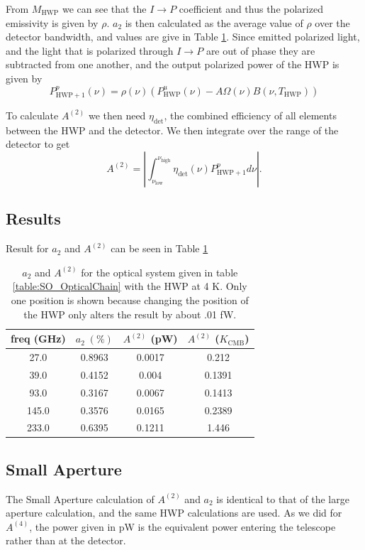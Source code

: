 \documentclass{article}
\theoremstyle{remark}
\newcommand{\tab}{\hspace*{2em}}
\renewcommand{\t}[1]{\text{#1}}
\newcommand{\A}[1]{A^{(#1)}}
\newcommand{\ip}{$I\rightarrow P$ }
\newcommand{\abs}[1]{\left|#1\right|}%
\begin{document}
\tab From $M_\t{HWP}$ we can see that the \ip coefficient and thus the polarized emissivity is given by $\rho$. 
$a_2$ is then calculated as the average value of $\rho$ over the detector bandwidth, and values are give in Table \ref{table:SO_a2}.
Since emitted polarized light, and the light that is polarized through \ip are out of phase they are subtracted from one another, and the output polarized power of the HWP is given by
\[
P^p_{\t{HWP} + 1}(\nu)= \rho(\nu) \left(P^u_\t{HWP}(\nu) - A \Omega(\nu) B(\nu, T_\t{HWP}) \right) 	
\]

\tab To calculate $\A2$ we then need $\eta_\t{det}$, the combined efficiency of all elements between the HWP and the detector.
We then integrate over the range of the detector to get
\[
\A2 = \abs{ \int_{\nu_\t{low}}^{\nu_\t{high}} \eta_\t{det}(\nu) P^p_{\t{HWP} + 1} d\nu }.
\]




\subsection{Results}


Result for $a_2$ and $\A2$ can be seen in Table \ref{table:SO_a2}




\begin{table}
\centering
\begin{tabular}{ |c|c|c|c|} 
	\hline
	freq (GHz) &  $a_2\; (\%)$ & $\A2$ (pW)  & $\A2$ ($K_\t{CMB}$) \\ \hline
	27.0  & 0.8963 & 0.0017 & 0.212 \\ 
	39.0  & 0.4152 & 0.004  & 0.1391\\ 
	93.0  & 0.3167 & 0.0067 & 0.1413\\ 
	145.0 & 0.3576 & 0.0165 & 0.2389\\ 
	233.0 & 0.6395 & 0.1211 & 1.446 \\ 
	\hline	
\end{tabular}



\caption{ $a_2$ and $\A2$ for the optical system given in table \ref{table:SO_OpticalChain} with the HWP at 4 K. 
Only one position is shown because changing the position of the HWP only alters the result by about .01 fW. 
}
\label{table:SO_a2}
\end{table}



\subsection{Small Aperture}
The Small Aperture calculation of $\A2$ and $a_2$ is identical to that of the large aperture calculation,
and the same HWP calculations are used. 
As we did for $\A4$, the power given in pW is the equivalent power entering the telescope rather than at the detector. 
\end{document}
